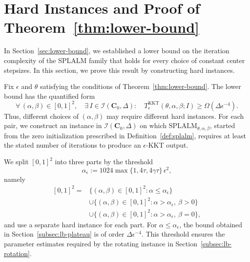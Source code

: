 \section{Hard Instances and Proof of Theorem~\ref{thm:lower-bound}}
\label{sec:lb-proof}

In Section~\ref{sec:lower-bound}, we established a lower bound on the iteration
complexity of the SPLALM family that holds for every choice of constant center
stepsizes. In this section, we prove this result by constructing hard instances.

Fix \(\epsilon\) and \(\theta\) satisfying the conditions of
Theorem~\ref{thm:lower-bound}. The lower bound has the quantified form
\[
\forall\,(\alpha,\beta)\in[0,1]^2,\quad
\exists\,I\in\mathcal I(\mathbf C_0,\Delta):\quad
T^{\mathrm{KKT}}_\epsilon(\theta,\alpha,\beta;I)
\geq \Omega(\Delta\epsilon^{-4}).
\]
Thus, different choices of \((\alpha,\beta)\) may require different hard
instances. For each pair, we construct an instance in
\(\mathcal I(\mathbf C_0,\Delta)\) on which
\(\mathrm{SPLALM}_{\theta,\alpha,\beta}\), started from the zero
initialization prescribed in Definition~\ref{def:splalm}, requires at least
the stated number of iterations to produce an \(\epsilon\)-KKT output.

We split \([0,1]^2\) into three parts by the threshold
\[
\alpha_\epsilon:=1024\max\{1,4\tau,4\gamma\tau\}\,\epsilon^2,
\]
namely
\[
\begin{aligned}
[0,1]^2
={}&\bigl\{(\alpha,\beta)\in[0,1]^2:\alpha\le\alpha_\epsilon\bigr\}\\
&\cup\bigl\{(\alpha,\beta)\in[0,1]^2:\alpha>\alpha_\epsilon,\ \beta>0\bigr\}\\
&\cup\bigl\{(\alpha,\beta)\in[0,1]^2:\alpha>\alpha_\epsilon,\ \beta=0\bigr\},
\end{aligned}
\]
and use a separate hard instance for each part. For
\(\alpha\le\alpha_\epsilon\), the bound obtained in
Section~\ref{subsec:lb-plateau} is of order \(\Delta\epsilon^{-4}\). This
threshold ensures the parameter estimates required by the rotating instance
in Section~\ref{subsec:lb-rotation}.


